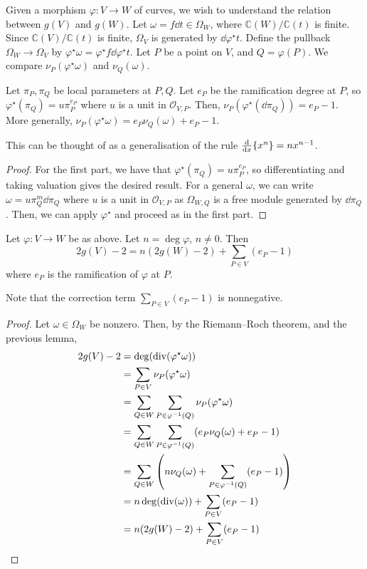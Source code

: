 Given a morphism \( \varphi \colon V \to W \) of curves, we wish to understand the relation between \( g(V) \) and \( g(W) \).
Let \( \omega = f \dd{t} \in \Omega_W \), where \( \mathbb C(W) / \mathbb C(t) \) is finite.
Since \( \mathbb C(V)/\mathbb C(t) \) is finite, \( \Omega_V \) is generated by \( \dd{\varphi^\star t} \).
Define the pullback \( \Omega_W \to \Omega_V \) by \( \varphi^\star \omega = \varphi^\star f \dd{\varphi^\star t} \).
Let \( P \) be a point on \( V \), and \( Q = \varphi(P) \).
We compare \( \nu_P(\varphi^\star \omega) \) and \( \nu_Q(\omega) \).
\begin{lemma}
    Let \( \pi_P, \pi_Q \) be local parameters at \( P, Q \).
    Let \( e_P \) be the ramification degree at \( P \), so \( \varphi^\star(\pi_Q) = u \pi_P^{e_P} \) where \( u \) is a unit in \( \mathcal O_{V,P} \).
    Then, \( \nu_P(\varphi^\star(\dd{\pi_Q})) = e_P - 1 \).
    More generally, \( \nu_P(\varphi^\star \omega) = e_P \nu_Q(\omega) + e_P - 1 \).
\end{lemma}
This can be thought of as a generalisation of the rule \( \dv{x}\qty{x^n} = nx^{n-1} \).
\begin{proof}
    For the first part, we have that \( \varphi^\star(\pi_Q) = u \pi_P^{e_P} \), so differentiating and taking valuation gives the desired result.
    For a general \( \omega \), we can write \( \omega = u \pi_Q^m \dd{\pi_Q} \) where \( u \) is a unit in \( \mathcal O_{V,P} \) as \( \Omega_{W,Q} \) is a free module generated by \( \dd{\pi_Q} \).
    Then, we can apply \( \varphi^\star \) and proceed as in the first part.
\end{proof}
\begin{theorem}
    Let \( \varphi \colon V \to W \) be as above.
    Let \( n = \deg \varphi \), \( n \neq 0 \).
    Then
    \[ 2g(V) - 2 = n(2g(W) - 2) + \sum_{P \in V} (e_P - 1) \]
    where \( e_P \) is the ramification of \( \varphi \) at \( P \).
\end{theorem}
Note that the correction term \( \sum_{P \in V} (e_P - 1) \) is nonnegative.
\begin{proof}
    Let \( \omega \in \Omega_W \) be nonzero.
    Then, by the Riemann--Roch theorem, and the previous lemma,
    \begin{align*}
        2g(V) - 2 &= \deg(\operatorname{div}(\varphi^\star \omega)) \\
        &= \sum_{P \in V} \nu_P(\varphi^\star \omega) \\
        &= \sum_{Q \in W} \sum_{P \in \varphi^{-1}(Q)} \nu_P(\varphi^\star \omega) \\
        &= \sum_{Q \in W} \sum_{P \in \varphi^{-1}(Q)} (e_P \nu_Q(\omega) + e_P - 1) \\
        &= \sum_{Q \in W} \qty(n\nu_Q(\omega) + \sum_{P \in \varphi^{-1}(Q)}(e_P - 1)) \\
        &= n \deg(\operatorname{div}(\omega)) + \sum_{P \in V} (e_P - 1) \\
        &= n (2g(W) - 2) + \sum_{P \in V} (e_P - 1)
    \end{align*}
\end{proof}
